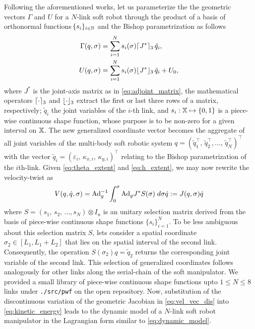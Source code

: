 Following the aforementioned works, let us parameterize the the geometric vectors $\Gamma$ and $U$ for a $N$-link soft robot through the product of a basis of orthonormal functions $\!\{s_i\}_{i \in \mathbb{N}}$ and the Bishop parametrization as follows
%
\begin{align} \Gamma(q,\sigma) & = \sum^N_{i=1} s_i(\sigma) \lceil J^*\rceil_3
\,\tilde{q}_i, \label{eq:theta_extent} \\ U(q,\sigma) & = \sum^N_{i=1} s_i(\sigma)
\lfloor J^*\rfloor_3\,\tilde{q}_i + U_0, \label{eq:h_extent} \end{align}
%
where $J^*$ is the joint-axis matrix as in \eqref{eq:adjoint_matrix}, the mathematical operators $\lceil\cdot\rceil_3$ and $\lfloor\cdot\rfloor_3$  extract the first or last three rows of a matrix, respectively;  $\tilde{q}_i$ the joint variables of the $i$-th link, and $s_i: \mathbb{X} \mapsto \{0,1\}$ is a piece-wise continuous shape function, whose purpose is to be non-zero for a given interval on $\mathbb{X}$.
The new generalized coordinate vector becomes the aggregate of all joint variables of the multi-body soft robotic system $q =  \left(\tilde{q}_1^\top,\,\tilde{q}_2^\top,...,\,\tilde{q}_N^\top \right)^\top$ with the vector $\tilde{q}_i = (\varepsilon_{i},\, \kappa_{x,i},\,\kappa_{y,i})^\top$ relating to the Bishop parametrization of the $i$th-link. Given \eqref{eq:theta_extent} and \eqref{eq:h_extent}, we may now rewrite the velocity-twist as
%
\begin{equation} V(q,\dot{q},\sigma) = \text{Ad}_g^{-1}
\int_0^\sigma \text{Ad}_g J^* S(\sigma) \; d\sigma \dot{q} := J(q,\sigma) \dot{q}
\label{eq:vel_vec_dis} \end{equation}
%
where $S = (s_1,\,s_2,\,...,s_N) \otimes I_n$ is an unitary selection matrix derived from the basis of piece-wise continuous shape functions $\!\{s_i\}_{i=1}^N$. To be less ambiguous about this selection matrix $S$, lets consider a spatial coordinate $\sigma_2 \in [L_1,L_1+L_2]$ that lies on the spatial interval of the second link. Consequently, the operation $S(\sigma_2) {q} = {\tilde{q}}_2$ returns the corresponding joint variable of the second link. This selection of
generalized coordinates follows analogously for other links along the serial-chain of the soft manipulator. We provided a small library of piece-wise continuous shape functions upto $1 \le N \le 8$ links under \texttt{./src/pwf} on the open repository\cite{Caasenbrood2021}.
Now, substitution of the discontinuous variation of the geometric Jacobian in \eqref{eq:vel_vec_dis} into \eqref{eq:kinetic_energy} leads to the dynamic model of a $N$-link soft robot manipulator in the
Lagrangian form similar to \eqref{eq:dynamic_model}.
